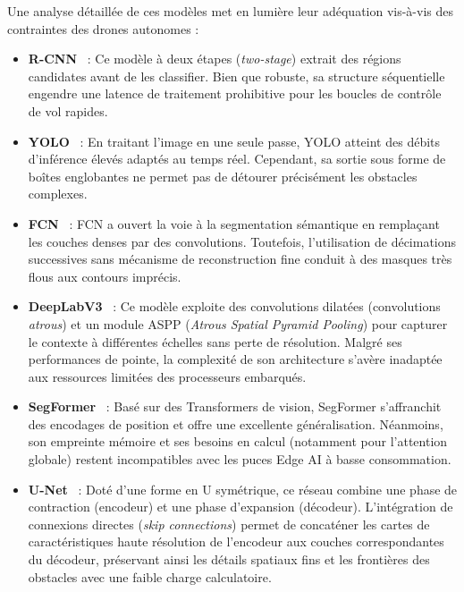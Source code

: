 Une analyse détaillée de ces modèles met en lumière leur adéquation vis-à-vis des contraintes des drones autonomes :
\begin{itemize}[leftmargin=1.8em, itemsep=4pt]
  \item \textbf{R-CNN}~\cite{girshick2014rcnn} : Ce modèle à deux étapes (\textit{two-stage}) extrait des régions candidates avant de les classifier. Bien que robuste, sa structure séquentielle engendre une latence de traitement prohibitive pour les boucles de contrôle de vol rapides.
  \item \textbf{YOLO}~\cite{redmon2016yolo} : En traitant l'image en une seule passe, YOLO atteint des débits d'inférence élevés adaptés au temps réel. Cependant, sa sortie sous forme de boîtes englobantes ne permet pas de détourer précisément les obstacles complexes.
  \item \textbf{FCN}~\cite{long2015fcn} : FCN a ouvert la voie à la segmentation sémantique en remplaçant les couches denses par des convolutions. Toutefois, l'utilisation de décimations successives sans mécanisme de reconstruction fine conduit à des masques très flous aux contours imprécis.
  \item \textbf{DeepLabV3}~\cite{chen2017deeplabv3} : Ce modèle exploite des convolutions dilatées (convolutions \textit{atrous}) et un module ASPP (\textit{Atrous Spatial Pyramid Pooling}) pour capturer le contexte à différentes échelles sans perte de résolution. Malgré ses performances de pointe, la complexité de son architecture s'avère inadaptée aux ressources limitées des processeurs embarqués.
  \item \textbf{SegFormer}~\cite{xie2021segformer} : Basé sur des Transformers de vision, SegFormer s'affranchit des encodages de position et offre une excellente généralisation. Néanmoins, son empreinte mémoire et ses besoins en calcul (notamment pour l'attention globale) restent incompatibles avec les puces Edge AI à basse consommation.
  \item \textbf{U-Net}~\cite{ronneberger2015unet} : Doté d'une forme en U symétrique, ce réseau combine une phase de contraction (encodeur) et une phase d'expansion (décodeur). L'intégration de connexions directes (\textit{skip connections}) permet de concaténer les cartes de caractéristiques haute résolution de l'encodeur aux couches correspondantes du décodeur, préservant ainsi les détails spatiaux fins et les frontières des obstacles avec une faible charge calculatoire.
\end{itemize}

